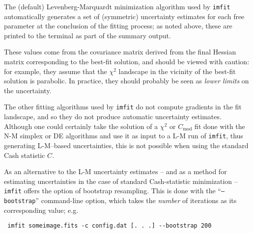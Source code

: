 \documentclass[10pt,a4paper,article]{memoir}
\newcommand{\imfit}{\texttt{imfit}}
\newcommand{\chisquare}{\ensuremath{\chi^{2}}}
\begin{document}
The (default) Levenberg-Marquardt minimization algorithm used by
\imfit{} automatically generates a set of (symmetric) uncertainty
estimates for each free parameter at the conclusion of the fitting
process; as noted above, these are printed to the terminal as part of
the summary output.

These values come from the covariance matrix derived from the final
Hessian matrix corresponding to the best-fit solution, and should be
viewed with caution: for example, they assume that the \chisquare{}
landscape in the vicinity of the best-fit solution is parabolic. In
practice, they should probably be seen as \textit{lower limits} on the
uncertainty.

The other fitting algorithms used by \imfit{} do not compute gradients
in the fit landscape, and so they do not produce automatic uncertainty
estimates. Although one could certainly take the solution of a
\chisquare{} or $C_{\mathrm{mod}}$ fit done with the N-M simplex or DE
algorithms and use it as input to a L-M run of \imfit, thus generating
L-M--based uncertainties, this is not possible when using the standard
Cash statistic $C$.

As an alternative to the L-M uncertainty estimates -- and as a method
for estimating uncertainties in the case of standard Cash-statistic
minimization -- \imfit{} offers the option of bootstrap resampling. This
is done with the ``\texttt{--bootstrap}'' command-line option, which
takes the \textit{number} of iterations as its corresponding value; e.g.
\begin{verbatim} imfit someimage.fits -c config.dat [. . .] --bootstrap 200 \end{verbatim}
\end{document}
